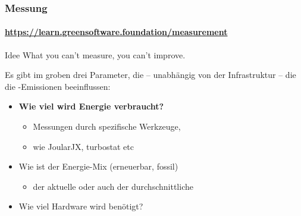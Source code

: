 \begin{frame}
\frametitle{Messung}
\framesubtitle{\href{https://learn.greensoftware.foundation/measurement}{https://learn.greensoftware.foundation/measurement}}
\begin{block}{Idee}
What you can't measure, you can't improve.
\end{block}

\pause
\vfill 

Es gibt im groben drei Parameter, die -- unabhängig von der Infrastruktur -- die die \COz-Emissionen beeinflussen:

\begin{itemize}
	\item \textbf<3->{{Wie viel wird Energie verbraucht?}	   }   
				\begin{itemize}
					\item Messungen durch spezifische Werkzeuge, 
					\item wie JoularJX, turbostat etc
\end{itemize}
   \item Wie ist der  Energie-Mix (erneuerbar, fossil)
	\begin{itemize}
		\item der aktuelle oder auch der durchschnittliche
	\end{itemize}
    \item Wie viel Hardware wird benötigt?
\end{itemize}

\end{frame}


